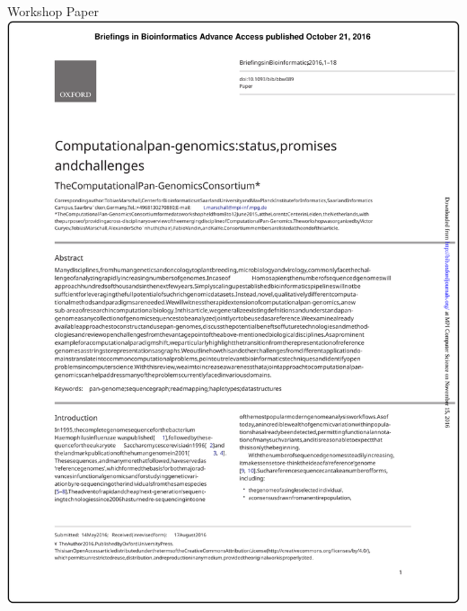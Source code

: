 \documentclass[notes=hide]{beamer}
\newcommand{\0}{\ensuremath{\mathtt{0}}}
\newcommand{\1}{\ensuremath{\mathtt{1}}}
\begin{document}
{ 
\begin{frame}{Workshop Paper}
\hspace{1em}
\includegraphics[width=\textwidth]{figs/briefings-paper}
\end{frame}
}
\end{document}
